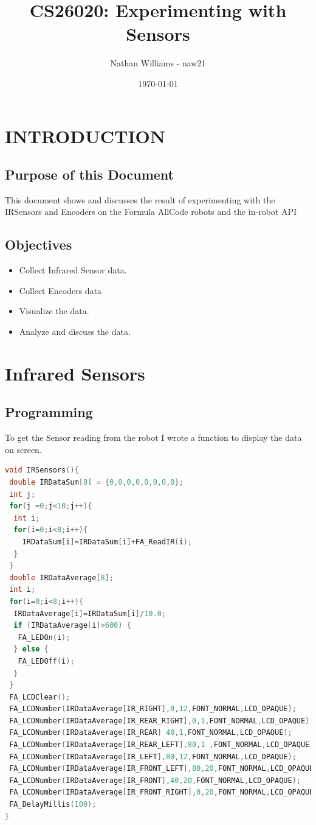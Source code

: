 \documentclass[11pt,a4paper,titlepage]{article}
\title{CS26020: Experimenting with Sensors}
\author{Nathan Williams - naw21}
\date{\today}
\begin{document}
\maketitle
\tableofcontents
\listoffigures
\newpage
\section{INTRODUCTION}

\subsection{Purpose of this Document}

This document shows and discusses the result of experimenting with the IRSensors and Encoders on the Formula AllCode robots\cite{Formula all-code} and the in-robot API\cite{in-robot api}

\subsection{Objectives}
	
\begin{itemize}
	\item Collect Infrared Sensor data.
	\item Collect Encoders data
	\item Visualize the data.
	\item Analyze and discuss the data.
\end{itemize}

\section{Infrared Sensors}
\subsection{Programming}
To get the Sensor reading from the robot I wrote a function to display the data on screen.
\begin{lstlisting}[language=C,frame=single]
void IRSensors(){
 double IRDataSum[8] = {0,0,0,0,0,0,0,0};
 int j;
 for(j =0;j<10;j++){
  int i;
  for(i=0;i<8;i++){
	IRDataSum[i]=IRDataSum[i]+FA_ReadIR(i);	
  }
 }
 double IRDataAverage[8];
 int i;
 for(i=0;i<8;i++){
  IRDataAverage[i]=IRDataSum[i]/10.0;
  if (IRDataAverage[i]>600) {
   FA_LEDOn(i);
  } else {
   FA_LEDOff(i);
  }
 }
 FA_LCDClear();
 FA_LCDNumber(IRDataAverage[IR_RIGHT],0,12,FONT_NORMAL,LCD_OPAQUE);
 FA_LCDNumber(IRDataAverage[IR_REAR_RIGHT],0,1,FONT_NORMAL,LCD_OPAQUE);
 FA_LCDNumber(IRDataAverage[IR_REAR] 40,1,FONT_NORMAL,LCD_OPAQUE);
 FA_LCDNumber(IRDataAverage[IR_REAR_LEFT],80,1 ,FONT_NORMAL,LCD_OPAQUE);
 FA_LCDNumber(IRDataAverage[IR_LEFT],80,12,FONT_NORMAL,LCD_OPAQUE);
 FA_LCDNumber(IRDataAverage[IR_FRONT_LEFT],80,20,FONT_NORMAL,LCD_OPAQUE);
 FA_LCDNumber(IRDataAverage[IR_FRONT],40,20,FONT_NORMAL,LCD_OPAQUE);
 FA_LCDNumber(IRDataAverage[IR_FRONT_RIGHT],0,20,FONT_NORMAL,LCD_OPAQUE);
 FA_DelayMillis(100);
}

\end{lstlisting}
\end{document}
